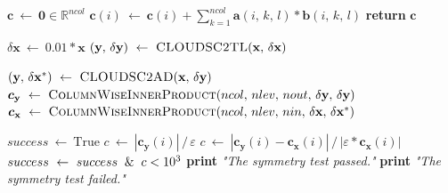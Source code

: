 \documentclass[gmd,manuscript,online]{copernicus}
\begin{document}
	\begin{algorithm}[t!]
		\caption{The symmetry test assessing the formal correctness of the coding implementation of the adjoint formulation of CLOUDSC2, denoted as \textsc{CLOUDSC2AD}. The machine epsilon is indicated as $\varepsilon$; all other symbols have the same meaning as in Algorithm \ref{alg:taylor-test}. Note that compared to its functional counterpart $F^* \left[ F \left( \boldsymbol{x} \right) \right] : \delta \boldsymbol{y} \mapsto \delta \boldsymbol{x}^*$, \textsc{CLOUDSC2AD($\mathbf{x}, \, \delta \mathbf{y}$)} returns both $\mathbf{y}$ and $\delta \mathbf{x}^*$.}
		\label{alg:symmetry-test}

		\begin{algorithmic}[1]
			 
			\State $\boldsymbol{c} ~ \gets ~ \mathbf{0} \in \mathbb{R}^{ncol}$
					\State $\boldsymbol{c}(i) ~ \gets ~ \boldsymbol{c}(i) + \sum_{k=1}^{ncol} \mathbf{a} \left( i, \, k, \, l \right) * \mathbf{b} \left( i, \, k, \, l \right)$
				\EndFor
			\EndFor
			\State \textbf{return} $\boldsymbol{c}$
			\EndFunction

			\Statex

			 

			\State $\delta \mathbf{x} ~ \gets ~ 0.01 * \mathbf{x}$
			\State $\left( \mathbf{y}, \, \delta \mathbf{y} \right) ~ \gets ~ \Call{CLOUDSC2TL}{\mathbf{x}, \, \delta \mathbf{x}}$ 

			\State $\left( \mathbf{y}, \, \delta \mathbf{x}^* \right) ~ \gets ~ \Call{CLOUDSC2AD}{\mathbf{x}, \, \delta \mathbf{y}}$ 
			\State $\boldsymbol{c}_{\mathbf{y}} ~ \gets ~ \Call{ColumnWiseInnerProduct}{ncol, \, nlev, \, nout, \, \delta \mathbf{y}, \, \delta \mathbf{y}}$
			\State $\boldsymbol{c}_{\mathbf{x}} ~ \gets ~ \Call{ColumnWiseInnerProduct}{ncol, \, nlev, \, nin, \, \delta \mathbf{x}, \, \delta \mathbf{x}^*}$

			\State $success ~ \gets ~ \text{True}$
					\State $c ~ \gets ~ \left| \boldsymbol{c}_{\mathbf{y}}(i) \right| \, / \, \varepsilon$
				\Else
					\State $c ~ \gets ~ \left| \boldsymbol{c}_{\mathbf{y}}(i) - \boldsymbol{c}_{\mathbf{x}}(i) \right| \, / \, \left| \varepsilon * \boldsymbol{c}_{\mathbf{x}}(i) \right|$
				\EndIf
				\State $success ~ \gets ~ success \And c < 10^3$
			\EndFor
				\State \textbf{print} \emph{"The symmetry test passed."}
			\Else
				\State \textbf{print} \emph{"The symmetry test failed."}
			\EndIf
			\EndProcedure
		\end{algorithmic}
	\end{algorithm}
\end{document}
